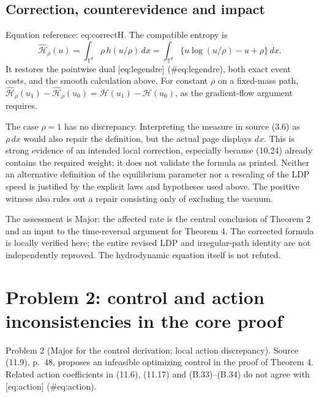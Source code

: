 \documentclass[10pt]{article}
\begin{document}
\subsection*{Correction, counterevidence and impact}
Equation reference: eq:correctH. The compatible entropy is \[
\widehat{\mathcal H}_\rho(u)=\int_{\mathbb T^d}\rho\,h(u/\rho)\,dx
 =\int_{\mathbb T^d}\{u\log(u/\rho)-u+\rho\}\,dx.\] It restores the pointwise dual [eq:legendre] (\#eq:legendre), both exact event costs, and the smooth calculation above. For constant \(\rho\) on a fixed-mass path, \(\widehat{\mathcal H}_\rho(u_1)-\widehat{\mathcal H}_\rho(u_0)=\mathcal H(u_1)-\mathcal H(u_0)\), as the gradient-flow argument requires.\par
The case \(\rho=1\) has no discrepancy. Interpreting the measure in source (3.6) as \(\rho\,dx\) would also repair the definition, but the actual page displays \(dx\). This is strong evidence of an intended local correction, especially because (10.24) already contains the required weight; it does not validate the formula as printed. Neither an alternative definition of the equilibrium parameter nor a rescaling of the LDP speed is justified by the explicit laws and hypotheses used above. The positive witness also rules out a repair consisting only of excluding the vacuum.\par
The assessment is Major: the affected rate is the central conclusion of Theorem 2 and an input to the time-reversal argument for Theorem 4. The corrected formula is locally verified here; the entire revised LDP and irregular-path identity are not independently reproved. The hydrodynamic equation itself is not refuted.\par
\section*{Problem 2: control and action inconsistencies in the core proof}
Problem 2 (Major for the control derivation; local action discrepancy).  Source (11.9), p. 48, proposes an infeasible optimizing control in the proof of Theorem 4. Related action coefficients in (11.6), (11.17) and (B.33)–(B.34) do not agree with [eq:action] (\#eq:action).\par
\end{document}
